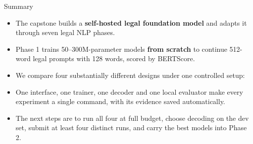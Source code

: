 \documentclass[aspectratio=169,11pt]{beamer}
\begin{document}
\begin{frame}{Summary}
  \begin{itemize}
    \item The capstone builds a \textbf{self-hosted legal foundation model} and adapts it through seven legal NLP phases.
    \item Phase 1 trains 50--300M-parameter models \textbf{from scratch} to continue 512-word legal prompts with 128 words, scored by BERTScore.
    \item We compare four substantially different designs under one controlled setup:
      \begin{center}
      \end{center}
    \item One interface, one trainer, one decoder and one local evaluator make every experiment a single command, with its evidence saved automatically.
    \item The next steps are to run all four at full budget, choose decoding on the dev set, submit at least four distinct runs, and carry the best models into Phase 2.
  \end{itemize}
\end{frame}
\end{document}
